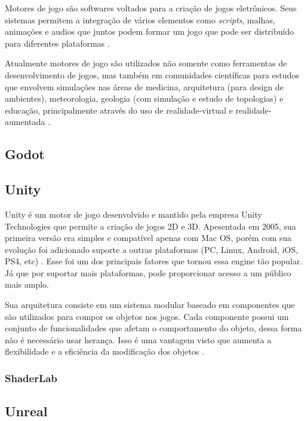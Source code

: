 Motores de jogo são softwares voltados para a criação de jogos eletrônicos. Seus sistemas permitem a integração de vários elementos como \textit{\Gls{scripts}}, malhas, animações e audios que juntos podem formar um jogo que pode ser distribuído para diferentes plataformas \cite{compStudyGE}. 

Atualmente motores de jogo são utilizados não somente como ferramentas de desenvolvimento de jogos, mas também em comunidades científicas para estudos que envolvem simulações nas áreas de medicina, arquitetura (para design de ambientes), meteorologia, geologia (com simulação e estudo de topologias) e educação, principalmente através do uso de \Gls{realidade-virtual} e \Gls{realidade-aumentada} \cite{comparacaoDesempenho2}. 

\subsection{Godot}
\label{sec:unity}

\subsection{Unity}
\label{sec:unity}

Unity é um motor de jogo desenvolvido e mantido pela empresa Unity Technologies que permite a criação de jogos 2D e 3D. Apesentada em 2005, sua primeira versão era simples e compatível apenas com Mac OS, porém com sua evolução foi adicionado suporte a outras plataformas (PC, Linux, Android, iOS, PS4, etc) \cite{compStudyGE}. Esse foi um dos principais fatores que tornou essa engine tão popular. Já que por suportar mais plataformas, pode proporcionar acesso a um público mais amplo.

Sua arquitetura consiste em um sistema modular baseado em componentes que são utilizados para compor os objetos nos jogos. Cada componente possui um conjunto de funcionalidades que afetam o comportamento do objeto, dessa forma não é necessário usar herança. Isso é uma vantagem visto que aumenta a flexibilidade e a eficiência da modificação dos objetos \cite{compStudyGE}.

\subsubsection{ShaderLab}
\label{sec:shaderlab}

\subsection{Unreal}
\label{sec:unity}



